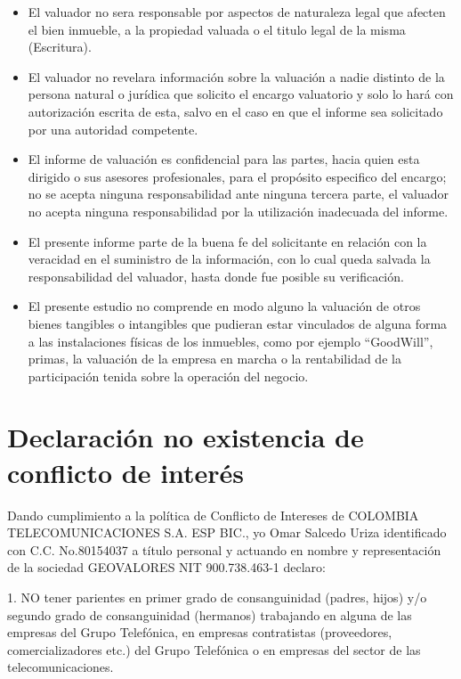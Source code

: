\documentclass[12pt,a4paper,twoside]{article}
\begin{document}
{\begin{itemize}
	\item El valuador no sera responsable por aspectos de naturaleza legal que afecten el bien inmueble, a la propiedad valuada o el titulo legal de la misma (Escritura).
	\item El valuador no revelara información sobre la valuación a nadie distinto de la persona natural o jurídica que solicito el encargo valuatorio y solo lo hará con autorización escrita de esta, salvo en el caso en que el informe sea solicitado por una autoridad competente.
	\item El informe de valuación es confidencial para las partes, hacia quien esta dirigido o sus asesores profesionales, para el propósito especifico del encargo; no se acepta ninguna responsabilidad ante ninguna tercera parte, el valuador no acepta ninguna responsabilidad por la utilización inadecuada del informe.
	\item El presente informe parte de la buena fe del solicitante en relación con la veracidad en el suministro de la información, con lo cual queda salvada la responsabilidad del valuador, hasta donde fue posible su verificación.
	\item El presente estudio no comprende en modo alguno la valuación de otros bienes tangibles o intangibles que pudieran estar vinculados de alguna forma a las instalaciones físicas de los inmuebles, como por ejemplo “GoodWill”, primas, la valuación de la empresa en marcha o la rentabilidad de la participación tenida sobre la operación del negocio.
	
\end{itemize}

\section{Declaración no existencia de conflicto de interés}

Dando cumplimiento a la política de Conflicto de Intereses de COLOMBIA\\ 
TELECOMUNICACIONES S.A. ESP BIC., yo Omar Salcedo Uriza identificado con C.C. No.80154037 a título personal y actuando en nombre y representación de la sociedad GEOVALORES NIT 900.738.463-1 declaro:

1. NO tener parientes en primer grado de consanguinidad (padres, hijos) y/o segundo grado de consanguinidad (hermanos) trabajando en alguna de las empresas del Grupo Telefónica, en empresas contratistas (proveedores, comercializadores etc.) del Grupo Telefónica o en empresas del sector de las telecomunicaciones.

}
\end{document}
